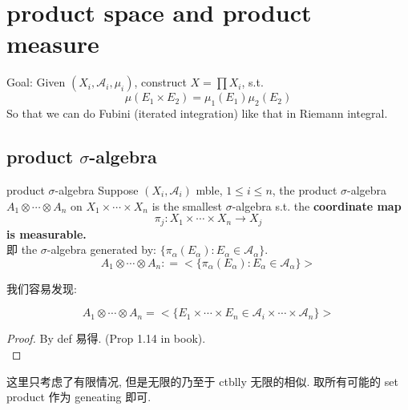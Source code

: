 \documentclass[lang=cn,11pt]{elegantbook}
\begin{document}
\chapter{product space and product measure}

Goal: Given $(X_i, \mathcal{A}_i, \mu_i)$, construct $X = \prod X_i $, s.t. 
\[
\mu(E_1 \times E_2 )  = \mu_1(E_1) \mu_2(E_2)
\]
So that we can do Fubini (iterated integration) like that in Riemann integral.


\section{product $\sigma$-algebra}
\begin{definition}{product $\sigma$-algebra}
Suppose $(X_i, \mathcal{A}_i)$ mble, $1 \leq i\leq n$, the product $\sigma$-algebra $A_1 \otimes \cdots \otimes A_n$ on $X_1 \times \cdots \times X_n$ is the smallest $\sigma$-algebra s.t. the\textbf{ coordinate map }$$ \pi_j: X_1 \times \cdots \times X_n \rightarrow X_j$$\textbf{is measurable.}\\
即 the $\sigma$-algebra generated by: \(
\{  \pi_\alpha (E_\alpha) : E_\alpha  \in \mathcal{A_\alpha} \}
\). \[
A_1 \otimes \cdots \otimes A_n : = <\{  \pi_\alpha (E_\alpha) : E_\alpha  \in \mathcal{A_\alpha} \}>
\]

\end{definition}


我们容易发现:
\begin{proposition}
$$A_1 \otimes \cdots \otimes A_n = <\{  E_1\times \cdots \times E_n \in \mathcal{A}_i \times \cdots \times \mathcal{A}_n  \}>$$
\end{proposition}
\begin{proof}
    By def 易得. (Prop 1.14 in book).\\
\end{proof}
\begin{remark}
  这里只考虑了有限情况, 但是无限的乃至于 ctblly 无限的相似. 取所有可能的 set product 作为 geneating 即可.
\end{remark}
\end{document}
